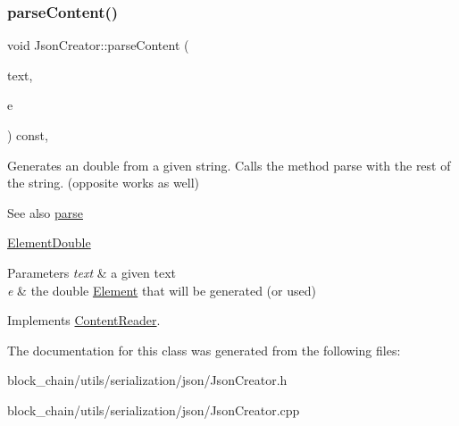 \subsubsection{\texorpdfstring{parse\+Content()}{parseContent()}\hspace{0.1cm}{\footnotesize\ttfamily [6/6]}}
{\footnotesize\ttfamily void Json\+Creator\+::parse\+Content (\begin{DoxyParamCaption}\item[{std\+::string \&}]{text,  }\item[{\mbox{\hyperlink{classElementDouble}{Element\+Double}} $\ast$}]{e }\end{DoxyParamCaption}) const\hspace{0.3cm}{\ttfamily [override]}, {\ttfamily [virtual]}}

Generates an double from a given string. Calls the method parse with the rest of the string. (opposite works as well) \begin{DoxySeeAlso}{See also}
\mbox{\hyperlink{classJsonCreator_a505ff309c6b144d29478804b0e187c6f}{parse}} 

\mbox{\hyperlink{classElementDouble}{Element\+Double}}
\end{DoxySeeAlso}

\begin{DoxyParams}{Parameters}
{\em text} & a given text \\
\hline
{\em e} & the double \mbox{\hyperlink{classElement}{Element}} that will be generated (or used) \\
\hline
\end{DoxyParams}


Implements \mbox{\hyperlink{classContentReader_ab4ba739ee5241848ae8af86e64e43a40}{Content\+Reader}}.



The documentation for this class was generated from the following files\+:\begin{DoxyCompactItemize}
\item 
block\+\_\+chain/utils/serialization/json/Json\+Creator.\+h\item 
block\+\_\+chain/utils/serialization/json/Json\+Creator.\+cpp\end{DoxyCompactItemize}

